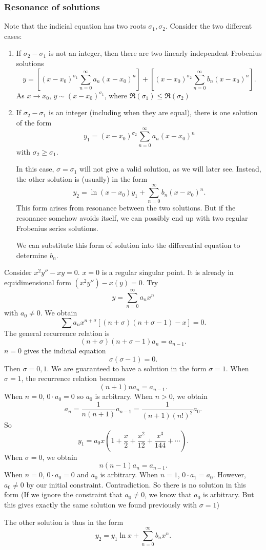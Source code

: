 \documentclass[a4paper]{article}
\begin{document}
\subsubsection*{Resonance of solutions}
Note that the indicial equation has two roots $\sigma_1, \sigma_2$. Consider the two different cases:
\begin{enumerate}
  \item If $\sigma_2 - \sigma_1$ is not an integer, then there are two linearly independent Frobenius solutions
    \[
      y = \left[(x - x_0)^{\sigma_1}\sum_{n = 0}^{\infty} a_n(x - x_0)^n\right] + \left[(x - x_0)^{\sigma_2}\sum_{n = 0}^{\infty} b_n(x - x_0)^n\right].
    \]
    As $x\to x_0$, $y \sim (x - x_0)^{\sigma_1}$, where $\Re(\sigma_1) \leq \Re(\sigma_2)$

  \item If $\sigma_2 - \sigma_1$ is an integer (including when they are equal), there is one solution of the form
    \[
      y_1 = (x - x_0)^{\sigma_2}\sum_{n = 0}^{\infty} a_n(x - x_0)^n
    \]
    with $\sigma_2 \geq \sigma_1$.

    In this case, $\sigma = \sigma_1$ will not give a valid solution, as we will later see. Instead, the other solution is (usually) in the form
    \[
      y_2 = \ln(x - x_0)y_1 + \sum_{n = 0}^\infty b_n(x - x_0)^n.
    \]
    This form arises from resonance between the two solutions. But if the resonance somehow avoids itself, we can possibly end up with two regular Frobenius series solutions.

    We can substitute this form of solution into the differential equation to determine $b_n$.
\end{enumerate}
\begin{eg}
  Consider $x^2 y'' - xy = 0$. $x = 0$ is a regular singular point. It is already in equidimensional form $(x^2y'') - x(y) = 0$. Try
  \[
    y = \sum_{n = 0}^\infty a_n x^n
  \]
  with $a_0 \not= 0$. We obtain
  \[
    \sum a_nx^{n + \sigma}[(n + \sigma)(n + \sigma - 1) - x] = 0.
  \]
  The general recurrence relation is
  \[
    (n + \sigma)(n + \sigma - 1)a_n = a_{n - 1}.
  \]
  $n = 0$ gives the indicial equation
  \[
    \sigma(\sigma - 1) = 0.
  \]
  Then $\sigma = 0, 1$. We are guaranteed to have a solution in the form $\sigma = 1$. When $\sigma = 1$, the recurrence relation becomes
  \[
    (n + 1)n a_n = a_{n - 1}.
  \]
  When $n = 0$, $0\cdot a_0 = 0$ so $a_0$ is arbitrary.
  When $n > 0$, we obtain
  \[
    a_n = \frac{1}{n(n +1)}a_{n - 1} = \frac{1}{(n + 1)(n!)^2}a_0.
  \]
  So
  \[
    y_1 = a_0x\left(1 + \frac{x}{2} + \frac{x^2}{12} + \frac{x^3}{144} + \cdots \right).
  \]
  When $\sigma = 0$, we obtain
  \[
    n(n - 1)a_n = a_{n - 1}.
  \]
  When $n = 0$, $0\cdot a_0 = 0$ and $a_0$ is arbitrary. When $n = 1$, $0\cdot a_1 = a_0$. However, $a_0\not= 0$ by our initial constraint. Contradiction. So there is no solution in this form (If we ignore the constraint that $a_0\not= 0$, we know that $a_0$ is arbitrary. But this gives exactly the same solution we found previously with $\sigma = 1$)

  The other solution is thus in the form
  \[
    y_2 = y_1\ln x + \sum_{n = 0}^\infty b_nx^n.
  \]
\end{eg}
\end{document}
